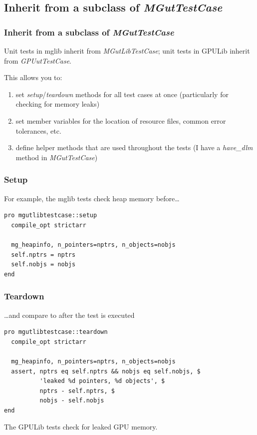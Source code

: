 \documentclass[12pt, handout]{beamer}
\begin{document}
\subsection{Inherit from a subclass of {\em MGutTestCase}}

\begin{frame}
  \frametitle{Inherit from a subclass of {\em MGutTestCase}}
Unit tests in mglib inherit from {\em MGutLibTestCase}; unit tests in GPULib inherit from {\em GPUutTestCase}.

This allows you to:
\begin{enumerate}
  \item set {\em setup}/{\em teardown} methods for all test cases at once (particularly for checking for memory leaks)
  \item set member variables for the location of resource files, common error tolerances, etc.
  \item define helper methods that are used throughout the tests (I have a {\em have\_dlm} method in {\em MGutTestCase})
\end{enumerate}
\end{frame}

\begin{frame}[t, fragile]
  \frametitle{Setup}

For example, the mglib tests check heap memory before\ldots
\begin{lstlisting}[basicstyle=\ttfamily\fontsize{10pt}{10pt}\selectfont]
pro mgutlibtestcase::setup
  compile_opt strictarr

  mg_heapinfo, n_pointers=nptrs, n_objects=nobjs
  self.nptrs = nptrs
  self.nobjs = nobjs
end
\end{lstlisting}
\end{frame}

\begin{frame}[t, fragile]
  \frametitle{Teardown}

\ldots and compare to after the test is executed
\begin{lstlisting}[basicstyle=\ttfamily\fontsize{10pt}{10pt}\selectfont]
pro mgutlibtestcase::teardown
  compile_opt strictarr

  mg_heapinfo, n_pointers=nptrs, n_objects=nobjs
  assert, nptrs eq self.nptrs && nobjs eq self.nobjs, $
          'leaked %d pointers, %d objects', $
          nptrs - self.nptrs, $
          nobjs - self.nobjs
end
\end{lstlisting}
The GPULib tests check for leaked GPU memory.
\end{frame}
\end{document}
